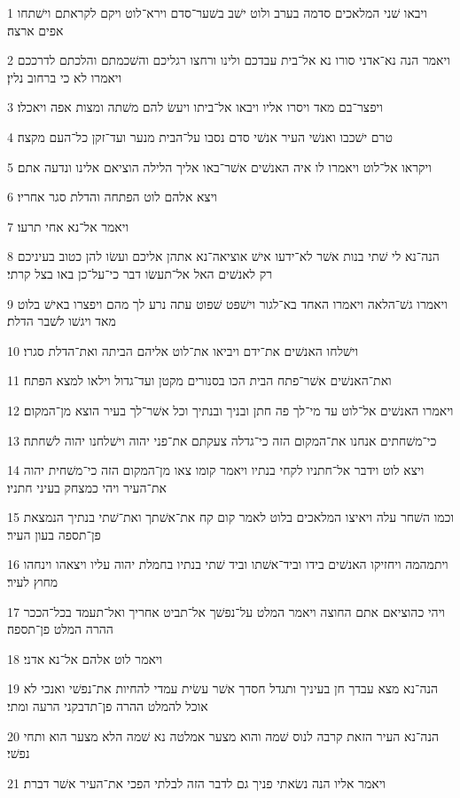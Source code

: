 \par 1 ויבאו שׁני המלאכים סדמה בערב ולוט ישׁב בשׁער־סדם וירא־לוט ויקם לקראתם וישׁתחו אפים ארצה׃
\par 2 ויאמר הנה נא־אדני סורו נא אל־בית עבדכם ולינו ורחצו רגליכם והשׁכמתם והלכתם לדרככם ויאמרו לא כי ברחוב נלין׃
\par 3 ויפצר־בם מאד ויסרו אליו ויבאו אל־ביתו ויעשׂ להם משׁתה ומצות אפה ויאכלו׃
\par 4 טרם ישׁכבו ואנשׁי העיר אנשׁי סדם נסבו על־הבית מנער ועד־זקן כל־העם מקצה׃
\par 5 ויקראו אל־לוט ויאמרו לו איה האנשׁים אשׁר־באו אליך הלילה הוציאם אלינו ונדעה אתם׃
\par 6 ויצא אלהם לוט הפתחה והדלת סגר אחריו׃
\par 7 ויאמר אל־נא אחי תרעו׃
\par 8 הנה־נא לי שׁתי בנות אשׁר לא־ידעו אישׁ אוציאה־נא אתהן אליכם ועשׂו להן כטוב בעיניכם רק לאנשׁים האל אל־תעשׂו דבר כי־על־כן באו בצל קרתי׃
\par 9 ויאמרו גשׁ־הלאה ויאמרו האחד בא־לגור וישׁפט שׁפוט עתה נרע לך מהם ויפצרו באישׁ בלוט מאד ויגשׁו לשׁבר הדלת׃
\par 10 וישׁלחו האנשׁים את־ידם ויביאו את־לוט אליהם הביתה ואת־הדלת סגרו׃
\par 11 ואת־האנשׁים אשׁר־פתח הבית הכו בסנורים מקטן ועד־גדול וילאו למצא הפתח׃
\par 12 ויאמרו האנשׁים אל־לוט עד מי־לך פה חתן ובניך ובנתיך וכל אשׁר־לך בעיר הוצא מן־המקום׃
\par 13 כי־משׁחתים אנחנו את־המקום הזה כי־גדלה צעקתם את־פני יהוה וישׁלחנו יהוה לשׁחתה׃
\par 14 ויצא לוט וידבר אל־חתניו לקחי בנתיו ויאמר קומו צאו מן־המקום הזה כי־משׁחית יהוה את־העיר ויהי כמצחק בעיני חתניו׃
\par 15 וכמו השׁחר עלה ויאיצו המלאכים בלוט לאמר קום קח את־אשׁתך ואת־שׁתי בנתיך הנמצאת פן־תספה בעון העיר׃
\par 16 ויתמהמה ויחזיקו האנשׁים בידו וביד־אשׁתו וביד שׁתי בנתיו בחמלת יהוה עליו ויצאהו וינחהו מחוץ לעיר׃
\par 17 ויהי כהוציאם אתם החוצה ויאמר המלט על־נפשׁך אל־תביט אחריך ואל־תעמד בכל־הככר ההרה המלט פן־תספה׃
\par 18 ויאמר לוט אלהם אל־נא אדני׃
\par 19 הנה־נא מצא עבדך חן בעיניך ותגדל חסדך אשׁר עשׂית עמדי להחיות את־נפשׁי ואנכי לא אוכל להמלט ההרה פן־תדבקני הרעה ומתי׃
\par 20 הנה־נא העיר הזאת קרבה לנוס שׁמה והוא מצער אמלטה נא שׁמה הלא מצער הוא ותחי נפשׁי׃
\par 21 ויאמר אליו הנה נשׂאתי פניך גם לדבר הזה לבלתי הפכי את־העיר אשׁר דברת׃
